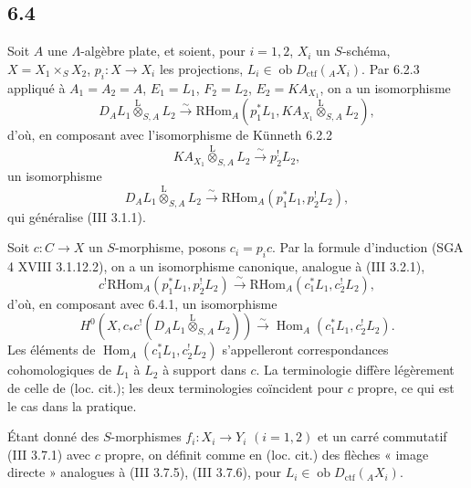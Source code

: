 \documentclass[11pt]{article}
\DeclareMathOperator{\Hom}{Hom}
\providecommand{\RHom}{\mathrm{RHom}}
\providecommand{\lten}{\overset{\mathrm L}{\otimes}}
\providecommand{\Ob}{\operatorname{ob}}
\providecommand{\RHom}{\mathrm{RHom}}
\providecommand{\Hom}{\operatorname{Hom}}
\providecommand{\lten}{\overset{\mathrm L}{\otimes}}
\providecommand{\RHom}{\mathrm R\mathcal{H}om}
\providecommand{\lten}{\overset{\mathrm L}{\otimes}}
\providecommand{\Ob}{\operatorname{ob}}
\providecommand{\lten}{\overset{\mathrm L}{\otimes}}
\providecommand{\lten}{\overset{\mathrm L}{\otimes}}
\providecommand{\Ob}{\operatorname{Ob}}
\providecommand{\lten}{\overset{\mathrm L}{\otimes}}
\begin{document}
\subsection*{6.4}
Soit $A$ une $\Lambda$-algèbre plate, et soient, pour $i=1,2$, $X_i$ un $S$-schéma, $X=X_1\times_SX_2$, $p_i:X\to X_i$ les projections, $L_i\in\Ob D_{\mathrm{ctf}}({}_AX_i)$. Par 6.2.3 appliqué à $A_1=A_2=A$, $E_1=L_1$, $F_2=L_2$, $E_2=KA_{X_1}$, on a un isomorphisme
\[
D_A L_1\lten_{S,A}L_2
\xrightarrow{\sim}
\RHom_A(p_1^*L_1,KA_{X_1}\lten_{S,A}L_2),
\]
d'où, en composant avec l'isomorphisme de Künneth 6.2.2
\[
KA_{X_1}\lten_{S,A}L_2\xrightarrow{\sim}p_2^!L_2,
\]
un isomorphisme
\begin{equation}
D_AL_1\lten_{S,A}L_2
\xrightarrow{\sim}
\RHom_A(p_1^*L_1,p_2^!L_2),
\tag{6.4.1}
\end{equation}
qui généralise (III 3.1.1).

Soit $c:C\to X$ un $S$-morphisme, posons $c_i=p_ic$. Par la formule d'induction (SGA 4 XVIII 3.1.12.2), on a un isomorphisme canonique, analogue à (III 3.2.1),
\begin{equation}
c^!\RHom_A(p_1^*L_1,p_2^!L_2)
\xrightarrow{\sim}
\RHom_A(c_1^*L_1,c_2^!L_2),
\tag{6.4.2}
\end{equation}
d'où, en composant avec 6.4.1, un isomorphisme
\begin{equation}
H^0(X,c_*c^!(D_AL_1\lten_{S,A}L_2))
\xrightarrow{\sim}
\Hom_A(c_1^*L_1,c_2^!L_2).
\tag{6.4.3}
\end{equation}
Les éléments de $\Hom_A(c_1^*L_1,c_2^!L_2)$ s'appelleront correspondances cohomologiques de $L_1$ à $L_2$ à support dans $c$. La terminologie diffère légèrement de celle de (loc. cit.); les deux terminologies coïncident pour $c$ propre, ce qui est le cas dans la pratique.

Étant donné des $S$-morphismes $f_i:X_i\to Y_i$ $(i=1,2)$ et un carré commutatif (III 3.7.1) avec $c$ propre, on définit comme en (loc. cit.) des flèches « image directe » analogues à (III 3.7.5), (III 3.7.6), pour $L_i\in\Ob D_{\mathrm{ctf}}({}_AX_i)$.
\end{document}
